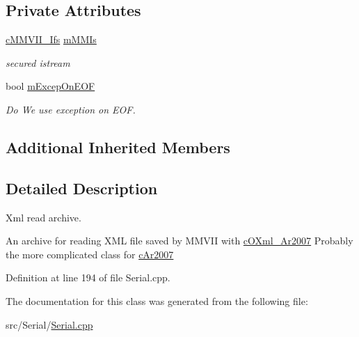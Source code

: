 \subsection*{Private Attributes}
\begin{DoxyCompactItemize}
\item 
\hyperlink{classMMVII_1_1cMMVII__Ifs}{c\+M\+M\+V\+I\+I\+\_\+\+Ifs} \hyperlink{classMMVII_1_1cIXml__Ar2007_a4f8f69b49368f2a712011d3bd5c9a640}{m\+M\+M\+Is}\hypertarget{classMMVII_1_1cIXml__Ar2007_a4f8f69b49368f2a712011d3bd5c9a640}{}\label{classMMVII_1_1cIXml__Ar2007_a4f8f69b49368f2a712011d3bd5c9a640}

\begin{DoxyCompactList}\small\item\em secured istream \end{DoxyCompactList}\item 
bool \hyperlink{classMMVII_1_1cIXml__Ar2007_a2f861372c7b83d836dd9128412c2a96a}{m\+Excep\+On\+E\+OF}\hypertarget{classMMVII_1_1cIXml__Ar2007_a2f861372c7b83d836dd9128412c2a96a}{}\label{classMMVII_1_1cIXml__Ar2007_a2f861372c7b83d836dd9128412c2a96a}

\begin{DoxyCompactList}\small\item\em Do We use exception on E\+OF. \end{DoxyCompactList}\end{DoxyCompactItemize}
\subsection*{Additional Inherited Members}


\subsection{Detailed Description}
Xml read archive. 

An archive for reading X\+ML file saved by M\+M\+V\+II with \hyperlink{classMMVII_1_1cOXml__Ar2007}{c\+O\+Xml\+\_\+\+Ar2007} Probably the more complicated class for \hyperlink{classMMVII_1_1cAr2007}{c\+Ar2007} 

Definition at line 194 of file Serial.\+cpp.



The documentation for this class was generated from the following file\+:\begin{DoxyCompactItemize}
\item 
src/\+Serial/\hyperlink{Serial_8cpp}{Serial.\+cpp}\end{DoxyCompactItemize}
